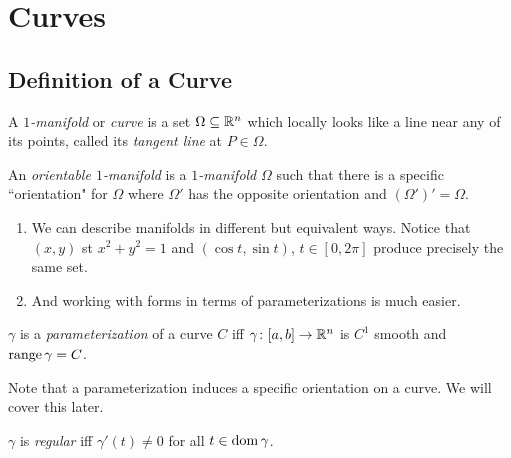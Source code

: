 \documentclass[notes.tex]{subfiles}
\begin{document}
\setcounter{section}{2}
\section{Curves}

\subsection{Definition of a Curve}
\begin{definition}[$1$-Manifold]
    A \textit{$1$-manifold} or \textit{curve} is a set $\Omega \subseteq \mathbb{R}^n$ which locally looks like a line near any of its points, called its \textit{tangent line} at $P \in \Omega$.
\end{definition}
\begin{definition}
    An \textit{orientable $1$-manifold} is a \textit{$1$-manifold} $\Omega$ such that there is a specific ``orientation" for $\Omega$ where $\Omega'$ has the opposite orientation and $(\Omega')' = \Omega$.
\end{definition}
\begin{enumerate}[label = \arabic*)]
    \item We can describe manifolds in different but equivalent ways. Notice that $(x, y)$ st $x^2 + y^2 = 1$ and $(\cos t, \sin t)$, $t \in [0, 2\pi]$ produce precisely the same set.
    \item And working with forms in terms of parameterizations is much easier.
\end{enumerate}

\begin{definition}
    $\gamma$ is a \textit{parameterization} of a curve $C$ iff $\gamma\colon [a, b] \to \mathbb{R}^n$ is $C^1$ smooth and $\operatorname{range} \gamma = C$.
\end{definition}
Note that a parameterization induces a specific orientation on a curve. We will cover this later.

\begin{definition}[Regularity]
    $\gamma$ is \textit{regular} iff $\gamma'(t) \neq 0$ for all $t \in \operatorname{dom} \gamma$.
\end{definition}
\end{document}
